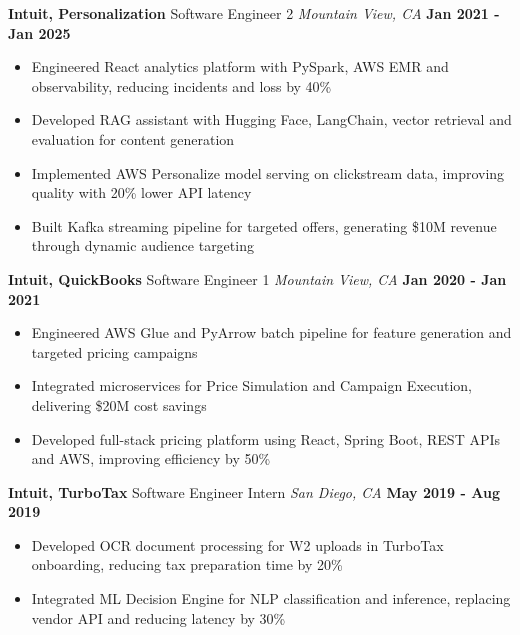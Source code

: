 \documentclass[10pt, letterpaper]{article}
\newcommand{\jobentry}[4]{
  \noindent\textbf{#1} \hfill #2 \hfill \textit{#3} \hfill \textbf{#4}
}
\begin{document}
\jobentry{Intuit, Personalization}{Software Engineer 2}{Mountain View, CA}{Jan 2021 - Jan 2025}
\begin{itemize}
	\item Engineered React analytics platform with PySpark, AWS EMR and observability, reducing incidents and loss by 40\%
	\item Developed RAG assistant with Hugging Face, LangChain, vector retrieval and evaluation for content generation
	\item Implemented AWS Personalize model serving on clickstream data, improving quality with 20\% lower API latency
	\item Built Kafka streaming pipeline for targeted offers, generating \$10M revenue through dynamic audience targeting
\end{itemize}

\jobentry{Intuit, QuickBooks}{Software Engineer 1}{Mountain View, CA}{Jan 2020 - Jan 2021}
\begin{itemize}
	\item Engineered AWS Glue and PyArrow batch pipeline for feature generation and targeted pricing campaigns
	\item Integrated microservices for Price Simulation and Campaign Execution, delivering \$20M cost savings
	\item Developed full-stack pricing platform using React, Spring Boot, REST APIs and AWS, improving efficiency by 50\%
\end{itemize}

\jobentry{Intuit, TurboTax}{Software Engineer Intern}{San Diego, CA}{May 2019 - Aug 2019}
\begin{itemize}
	\item Developed OCR document processing for W2 uploads in TurboTax onboarding, reducing tax preparation time by 20\%
	\item Integrated ML Decision Engine for NLP classification and inference, replacing vendor API and reducing latency by 30\%
\end{itemize}
\end{document}
